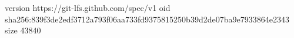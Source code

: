 version https://git-lfs.github.com/spec/v1
oid sha256:839f3de2edf3712a793f06aa733fd9375815250b39d2de07ba9e7933864e2343
size 43840

